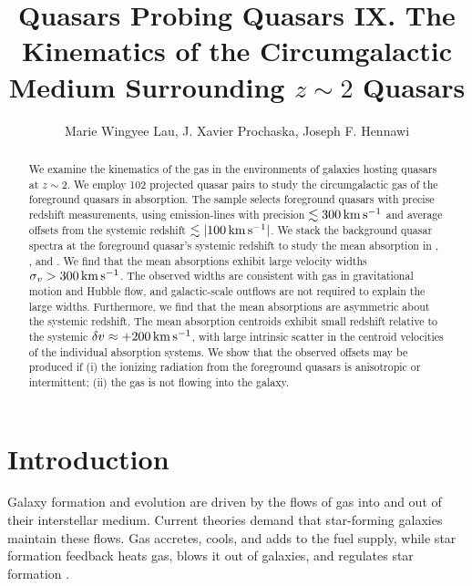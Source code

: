 \documentclass[iop]{emulateapj}
\begin{document}
\title{Quasars Probing Quasars IX. The Kinematics of the Circumgalactic Medium Surrounding 
$z\sim2$ Quasars}

\author{Marie Wingyee Lau, J. Xavier Prochaska, 
Joseph F. Hennawi
}

\begin{abstract}
We examine the kinematics of the gas in the environments of galaxies hosting quasars at $z\sim2$. 
We employ 102 projected quasar pairs to study the circumgalactic gas of the foreground quasars in 
absorption. The sample selects foreground quasars with precise redshift measurements, using 
emission-lines with precision $\lesssim300\,{\rm km\,s^{-1}}$ and average offsets from the 
systemic redshift $\lesssim|100\,{\rm km\,s^{-1}}|$. We stack the background quasar spectra at the 
foreground quasar's systemic redshift to study the mean absorption in , , 
and . We find that the mean absorptions exhibit large velocity widths 
$\sigma_v>300\,{\rm km\,s^{-1}}$. The observed widths are consistent with gas in gravitational 
motion and Hubble flow, and galactic-scale outflows are not required to explain the large 
widths. Furthermore, we find that the mean absorptions are asymmetric about the systemic redshift. 
The mean absorption centroids exhibit small redshift relative to the 
systemic $\delta v\approx+200\,{\rm km\,s^{-1}}$, with large intrinsic scatter in the centroid 
velocities of the individual absorption systems. We show that the observed offsets may be produced 
if (i) the ionizing radiation from the foreground quasars is anisotropic or intermittent; (ii) the 
gas is not flowing into the galaxy.  
\end{abstract}



\section{Introduction}
\label{sec:introduction}

Galaxy formation and evolution are driven by the flows of gas into and out of their interstellar 
medium. Current theories demand that star-forming galaxies maintain these flows. Gas accretes, 
cools, and adds to the fuel supply, while star formation feedback heats gas, blows it out of 
galaxies, and regulates star formation \citep[for a review see][]{SomervilleDave15}. 
\end{document}
